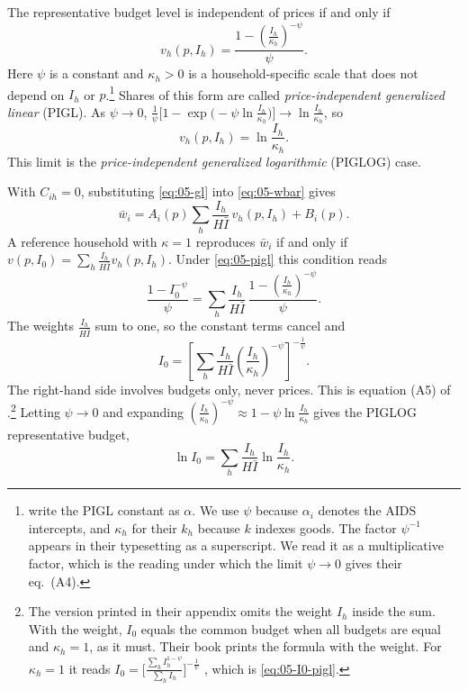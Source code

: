 The representative budget level is independent of prices if and only if
\begin{equation}\label{eq:05-pigl}
  v_h(p, I_h) = \frac{1 - \left(\frac{I_h}{\kappa_h}\right)^{-\psi}}{\psi}.
\end{equation}
Here $\psi$ is a constant and $\kappa_h > 0$ is a household-specific scale that does not depend on $I_h$
or $p$.\footnote{\citet[eq.~A3]{DeatonMuellbauer1980a} write the PIGL constant as $\alpha$. We use $\psi$
because $\alpha_i$ denotes the AIDS intercepts, and $\kappa_h$ for their $k_h$ because $k$ indexes goods.
The factor $\psi^{-1}$ appears in their typesetting as a superscript. We read it as a multiplicative
factor, which is the reading under which the limit $\psi \to 0$ gives their eq.~(A4).} Shares of this form
are called \emph{price-independent generalized linear} (PIGL). As $\psi \to 0$,
$\frac{1}{\psi}\bigl[1 - \exp\bigl(-\psi\ln\frac{I_h}{\kappa_h}\bigr)\bigr] \to \ln\frac{I_h}{\kappa_h}$, so
\begin{equation}\label{eq:05-piglog-v}
  v_h(p, I_h) = \ln \frac{I_h}{\kappa_h}.
\end{equation}
This limit is the \emph{price-independent generalized logarithmic} (PIGLOG) case.

With $C_{ih} = 0$, substituting \eqref{eq:05-gl} into \eqref{eq:05-wbar} gives
\begin{equation*}
  \bar w_i = A_i(p) \sum_h \frac{I_h}{H\bar I}\, v_h(p, I_h) + B_i(p).
\end{equation*}
A reference household with $\kappa = 1$ reproduces $\bar w_i$ if and only if $v(p, I_0) = \sum_h
\frac{I_h}{H\bar I} v_h(p, I_h)$. Under \eqref{eq:05-pigl} this condition reads
\begin{equation*}
  \frac{1 - I_0^{-\psi}}{\psi} = \sum_h \frac{I_h}{H\bar I}\,
  \frac{1 - \left(\frac{I_h}{\kappa_h}\right)^{-\psi}}{\psi} .
\end{equation*}
The weights $\frac{I_h}{H\bar I}$ sum to one, so the constant terms cancel and
\begin{equation}\label{eq:05-I0-pigl}
  I_0 = \left[\sum_h \frac{I_h}{H\bar I}\left(\frac{I_h}{\kappa_h}\right)^{-\psi}\right]^{-\frac{1}{\psi}} .
\end{equation}
The right-hand side involves budgets only, never prices. This is equation (A5) of
\citet{DeatonMuellbauer1980a}.\footnote{The version printed in their appendix omits the weight $I_h$
inside the sum. With the weight, $I_0$ equals the common budget when all budgets are equal and
$\kappa_h = 1$, as it must. Their book prints the formula with the weight. For $\kappa_h = 1$ it reads
$I_0 = \bigl[\frac{\sum_h I_h^{1-\psi}}{\sum_h I_h}\bigr]^{-\frac{1}{\psi}}$ \citep[\S 6.2, eq.~2.13,
p.~156]{DeatonMuellbauer1980b}, which is \eqref{eq:05-I0-pigl}.} Letting $\psi \to 0$ and expanding
$(\frac{I_h}{\kappa_h})^{-\psi} \approx 1 - \psi\ln\frac{I_h}{\kappa_h}$ gives the PIGLOG representative
budget,
\begin{equation}\label{eq:05-I0-piglog}
  \ln I_0 = \sum_h \frac{I_h}{H\bar I}\ln\frac{I_h}{\kappa_h}.
\end{equation}

